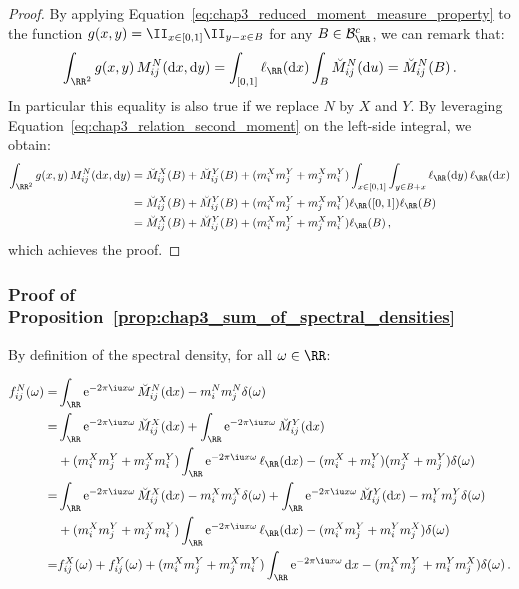 \begin{subappendices}
\begin{proof}
      By applying Equation~\eqref{eq:chap3_reduced_moment_measure_property} to the function $g(x,y) = \II_{x \in [0,1]}\II_{y-x\in B}$ for any $B\in\mathcal{B}_\RR^c$, we can remark that:
  \begin{equation*}
      \int_{\RR^2}{g(x, y) \, M_{ij}^N(\mathrm{d}x, \mathrm{d}y)} = \int_{[0,1]}{\ell_{\RR}(\mathrm{d}x)}\int_{B}{\breve M_{ij}^N(\mathrm{d}u)} = \breve M_{ij}^N(B)\,.
  \end{equation*}
  In particular this equality is also true if we replace $N$ by $X$ and $Y$. 
      By leveraging Equation~\eqref{eq:chap3_relation_second_moment} on the left-side integral, we obtain:
  \begin{align*}
      \int_{\RR^2}{g(x, y) \, M_{ij}^N(\mathrm{d}x, \mathrm{d}y)} &= \breve M_{ij}^{X}(B) +  \breve M_{ij}^{Y}(B) + (m_i^X m_j^Y + m_j^X m_i^Y)\int_{x\in[0,1]}{\int_{y\in B + x}{\ell_\RR(\mathrm{d}y)} \, \ell_\RR(\mathrm{d}x)}  \\
      &= \breve M_{ij}^X(B) + \breve M_{ij}^Y(B)+ (m_i^X m_j^Y + m_j^X m_i^Y)\ell_{\RR}([0,1])\ell_{\RR}(B) \\
      &= \breve M_{ij}^X(B) + \breve M_{ij}^Y(B)+ (m_i^X m_j^Y + m_j^X m_i^Y)\ell_{\RR}(B) \,,
  \end{align*}
  which achieves the proof.

  \end{proof}
          
\subsubsection*{Proof of Proposition~\ref{prop:chap3_sum_of_spectral_densities}}
   By definition of the spectral density, for all $\omega\in\RR$:
   
  \begin{align}
      f_{ij}^N(\omega) = &\int_\RR \mathrm{e}^{-2\pi \iu x \omega} \, \breve M_{ij}^N(\mathrm{d}x) - m_i^N m_j^N \delta(\omega)\nonumber \\
      = &\int_\RR \mathrm{e}^{-2\pi \iu x \omega} \, \breve M_{ij}^X(\mathrm d x) + \int_\RR \mathrm{e}^{-2\pi \iu x \omega} \, \breve M_{ij}^Y(\mathrm d x)\nonumber  \\
      &+ (m_i^X m_j^Y + m_j^X m_i^Y) \int_\RR \mathrm{e}^{-2\pi \iu x \omega} \, \ell_{\RR}(\mathrm{d}x) - (m_i^X + m_i^Y)(m_j^X + m_j^Y) \delta(\omega)\nonumber  \\
      = &\int_\RR \mathrm{e}^{-2\pi \iu x \omega} \, \breve M_{ij}^X(\mathrm d x) - m_i^X m_j^X \delta(\omega) + \int_\RR \mathrm{e}^{-2\pi \iu x \omega} \, \breve M_{ij}^Y(\mathrm d x) - m_i^Y m_j^Y \delta(\omega) \nonumber \\
      &+ (m_i^X m_j^Y + m_j^X m_i^Y) \int_\RR \mathrm{e}^{-2\pi \iu x \omega} \, \ell_{\RR}(\mathrm{d}x) - (m_i^X m_j^Y + m_i^Y m_j^X) \delta(\omega) \nonumber \\
      = &f_{ij}^X(\omega) + f_{ij}^Y(\omega) + (m_i^X m_j^Y + m_j^X m_i^Y) \int_\RR \mathrm{e}^{-2\pi \iu x \omega} \,\mathrm{d}x - (m_i^X m_j^Y + m_i^Y m_j^X) \delta(\omega)\,.\label{eq:chap3_dirac_difference} 
    \end{align}
              

\end{subappendices}
